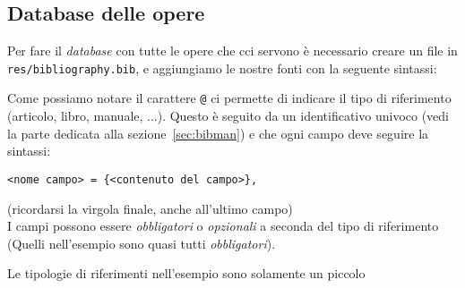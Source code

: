 \subsection{Database delle opere}
Per fare il \textit{database} con tutte le opere che cci servono è necessario
creare un file in \texttt{res/bibliography.bib}, e aggiungiamo le nostre fonti
con la seguente sintassi:

Come possiamo notare il carattere \verb!@! ci permette di indicare il tipo di 
riferimento (articolo, libro, manuale, ...). Questo è seguito da un 
identificativo univoco (vedi la parte dedicata alla sezione~\ref{sec:bibman}) 
e che ogni campo deve seguire la sintassi:
\begin{lstlisting}
<nome campo> = {<contenuto del campo>},
\end{lstlisting}
(ricordarsi la virgola finale, anche all'ultimo campo)\\
I campi possono essere \emph{obbligatori} o \emph{opzionali} a seconda del 
tipo di riferimento (Quelli nell'esempio sono quasi tutti \emph{obbligatori}).
\par Le tipologie di riferimenti nell'esempio sono solamente un piccolo 
